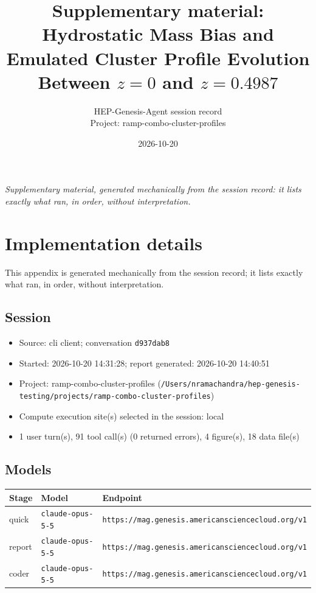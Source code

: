 \documentclass[11pt,a4paper]{article}
\title{Supplementary material: Hydrostatic Mass Bias and Emulated Cluster Profile Evolution Between $z=0$ and $z=0.4987$}
\author{HEP-Genesis-Agent session record \\ \small Project: ramp-combo-cluster-profiles}
\date{2026-10-20}
\begin{document}
\maketitle
\noindent\textit{\small Supplementary material, generated mechanically from the session record: it lists exactly what ran, in order, without interpretation.}
\vspace{1em}



\appendix
\section{Implementation details}
\label{app:impl}
This appendix is generated mechanically from the session record; it lists exactly what ran, in order, without interpretation.
\subsection{Session}
\begin{itemize}
  \item Source: cli client; conversation \texttt{d937dab8}
  \item Started: 2026-10-20 14:31:28; report generated: 2026-10-20 14:40:51
  \item Project: ramp-combo-cluster-profiles (\texttt{/\allowbreak{}Users/\allowbreak{}nramachandra/\allowbreak{}hep-genesis-testing/\allowbreak{}projects/\allowbreak{}ramp-combo-cluster-profiles})
  \item Compute execution site(s) selected in the session: local
  \item 1 user turn(s), 91 tool call(s) (0 returned errors), 4 figure(s), 18 data file(s)
\end{itemize}
\subsection{Models}
\begin{longtable}{@{}p{}p{}p{}@{}}
\toprule Stage & Model & Endpoint \\ \midrule \endhead
quick & \texttt{claude-opus-5-5} & \texttt{https:\allowbreak{}/\allowbreak{}/\allowbreak{}mag.genesis.americansciencecloud.org/\allowbreak{}v1} \\
report & \texttt{claude-opus-5-5} & \texttt{https:\allowbreak{}/\allowbreak{}/\allowbreak{}mag.genesis.americansciencecloud.org/\allowbreak{}v1} \\
coder & \texttt{claude-opus-5-5} & \texttt{https:\allowbreak{}/\allowbreak{}/\allowbreak{}mag.genesis.americansciencecloud.org/\allowbreak{}v1} \\
\bottomrule\end{longtable}
\end{document}
